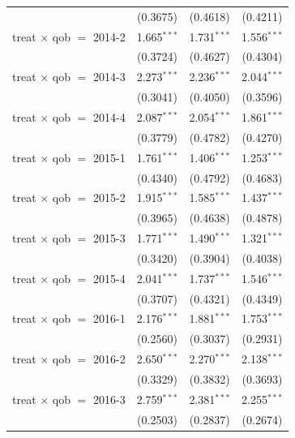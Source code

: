 \begin{table}[htbp]
\begin{tabular}{lccc}
                                     & (0.3675)      & (0.4618)       & (0.4211)\\   
      treat $\times$ qob $=$ 2014-2  & 1.665$^{***}$ & 1.731$^{***}$  & 1.556$^{***}$\\   
                                     & (0.3724)      & (0.4627)       & (0.4304)\\   
      treat $\times$ qob $=$ 2014-3  & 2.273$^{***}$ & 2.236$^{***}$  & 2.044$^{***}$\\   
                                     & (0.3041)      & (0.4050)       & (0.3596)\\   
      treat $\times$ qob $=$ 2014-4  & 2.087$^{***}$ & 2.054$^{***}$  & 1.861$^{***}$\\   
                                     & (0.3779)      & (0.4782)       & (0.4270)\\   
      treat $\times$ qob $=$ 2015-1  & 1.761$^{***}$ & 1.406$^{***}$  & 1.253$^{***}$\\   
                                     & (0.4340)      & (0.4792)       & (0.4683)\\   
      treat $\times$ qob $=$ 2015-2  & 1.915$^{***}$ & 1.585$^{***}$  & 1.437$^{***}$\\   
                                     & (0.3965)      & (0.4638)       & (0.4878)\\   
      treat $\times$ qob $=$ 2015-3  & 1.771$^{***}$ & 1.490$^{***}$  & 1.321$^{***}$\\   
                                     & (0.3420)      & (0.3904)       & (0.4038)\\   
      treat $\times$ qob $=$ 2015-4  & 2.041$^{***}$ & 1.737$^{***}$  & 1.546$^{***}$\\   
                                     & (0.3707)      & (0.4321)       & (0.4349)\\   
      treat $\times$ qob $=$ 2016-1  & 2.176$^{***}$ & 1.881$^{***}$  & 1.753$^{***}$\\   
                                     & (0.2560)      & (0.3037)       & (0.2931)\\   
      treat $\times$ qob $=$ 2016-2  & 2.650$^{***}$ & 2.270$^{***}$  & 2.138$^{***}$\\   
                                     & (0.3329)      & (0.3832)       & (0.3693)\\   
      treat $\times$ qob $=$ 2016-3  & 2.759$^{***}$ & 2.381$^{***}$  & 2.255$^{***}$\\   
                                     & (0.2503)      & (0.2837)       & (0.2674)\\   

\end{tabular}
\end{table}
